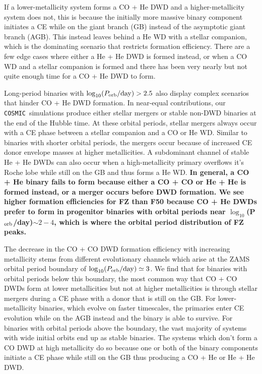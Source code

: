 \documentclass[twocolumn, linenumbers]{aastex631}
\newcommand{\cosmic}{\texttt{COSMIC}}
\begin{document}
If a lower-metallicity system forms a CO + He DWD and a higher-metallicity system does not, this is because the initially more massive binary component initiates a CE while on the giant branch (GB) instead of the asymptotic giant branch (AGB). This instead leaves behind a He WD with a stellar companion, which is the dominating scenario that restricts formation efficiency. There are a few edge cases where either a He + He DWD is formed instead, or when a CO WD and a stellar companion is formed and there has been very nearly but not quite enough time for a CO + He DWD to form. 

Long-period binaries with $\log_{10}(P_{\rm{orb}}/\rm{day})>2.5$ also display complex scenarios that hinder CO + He DWD formation. In near-equal contributions, our \cosmic\ simulations produce either stellar mergers or stable non-DWD binaries at the end of the Hubble time. At these orbital periods, stellar mergers always occur with a CE phase between a stellar companion and a CO or He WD. Similar to binaries with shorter orbital periods, the mergers occur because of increased CE donor envelope masses at higher metallicities. A subdominant channel of stable He + He DWDs can also occur when a high-metallicity primary overflows it's Roche lobe while still on the GB and thus forms a He WD. \textbf{In general, a CO + He binary fails to form because either a CO + CO or He + He is formed instead, or a merger occurs before DWD formation. We see higher formation efficiencies for FZ than F50 because CO + He DWDs prefer to form in progenitor binaries with orbital periods near $\log_{10}$(P$_{\rm{orb}}$/day)$\sim2-4$, which is where the orbital period distribution of FZ peaks.}

The decrease in the CO + CO DWD formation efficiency with increasing metallicity stems from different evolutionary channels which arise at the ZAMS orbital period boundary of $\log_{10}(P_{\rm{orb}}/\rm{day})\simeq3$. We find that for binaries with orbital periods below this boundary, the most common way that CO + CO DWDs form at lower metallicities but not at higher metallicities is through stellar mergers during a CE phase with a donor that is still on the GB. For lower-metallicity binaries, which evolve on faster timescales, the primaries enter CE evolution while on the AGB instead and the binary is able to survive. For binaries with orbital periods above the boundary, the vast majority of systems with wide initial orbits end up as stable binaries. The systems which don’t form a CO DWD at high metallicity do so because one or both of the binary components initiate a CE phase while still on the GB thus producing a CO + He or He + He DWD. 
\end{document}
